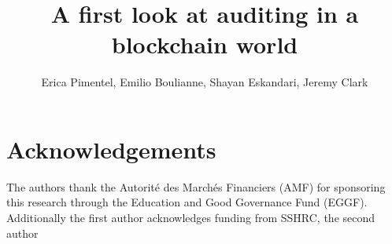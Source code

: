 \documentclass[envcountsect]{llncs}
\begin{document}
\frontmatter
\mainmatter

\title{\Large \bf A first look at auditing in a blockchain world}

\author{
	Erica Pimentel,
	Emilio Boulianne,
	Shayan Eskandari,
	Jeremy Clark
	}


\maketitle










\section{Acknowledgements}

The authors thank the Autorit\'e des March\'es Financiers (AMF) for sponsoring this research through the Education and Good Governance Fund (EGGF). Additionally the first author acknowledges funding from SSHRC, the second author 





\clearpage
\appendix
\end{document}
